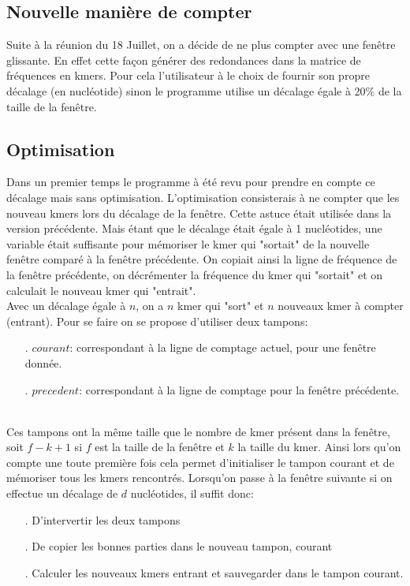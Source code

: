 \subsection{Nouvelle manière de compter}
Suite à la réunion du 18 Juillet, on a décide de ne plus compter avec une fenêtre glissante. En effet cette façon générer des redondances dans la matrice de fréquences en kmers. Pour 
cela l'utilisateur à le choix de fournir son propre décalage (en nucléotide) sinon le programme utilise un décalage égale à 20\% de la taille de la fenêtre.

\subsection{Optimisation}
Dans un premier temps le programme à été revu pour prendre en compte ce décalage mais sans optimisation. L'optimisation consisterais à ne compter que les nouveau kmers lors du décalage de la fenêtre. Cette astuce était utilisée dans la version précédente. Mais étant que le décalage était égale à 1 nucléotides, une variable était suffisante pour mémoriser le kmer qui "sortait" de la nouvelle fenêtre comparé à la fenêtre précédente. On copiait ainsi la ligne de fréquence de la fenêtre précédente, on décrémenter la fréquence du kmer qui "sortait" et on calculait le nouveau kmer qui "entrait".
\\

Avec un décalage égale à $n$, on a $n$ kmer qui "sort" et $n$ nouveaux kmer à compter (entrant). Pour se faire on se propose d'utiliser deux tampons: 
\\
\begin{itemize}
 \item[.] $courant$: correspondant à la ligne de comptage actuel, pour une fenêtre donnée.
 \item[.] $precedent$: correspondant à la ligne de comptage pour la fenêtre précédente.
\end{itemize}
~\\

Ces tampons ont la même taille que le nombre de kmer présent dans la fenêtre, soit $f-k+1$ si $f$ est la taille de la fenêtre et $k$ la taille du kmer. Ainsi lors qu'on compte une toute première fois cela permet d'initialiser le tampon courant et de mémoriser tous les kmers rencontrés. Lorsqu'on passe à la fenêtre suivante si on effectue un décalage de $d$ nucléotides, il suffit donc:
\\
\begin{itemize}
 \item[.] D'intervertir les deux tampons
 \item[.] De copier les bonnes parties dans le nouveau tampon, courant
 \item[.] Calculer les nouveaux kmers entrant et sauvegarder dans le tampon courant.
\end{itemize}
~\\

